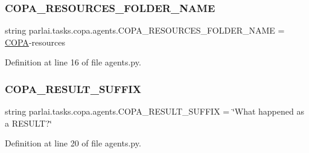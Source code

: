 \subsubsection{\texorpdfstring{C\+O\+P\+A\+\_\+\+R\+E\+S\+O\+U\+R\+C\+E\+S\+\_\+\+F\+O\+L\+D\+E\+R\+\_\+\+N\+A\+ME}{COPA\_RESOURCES\_FOLDER\_NAME}}
{\footnotesize\ttfamily string parlai.\+tasks.\+copa.\+agents.\+C\+O\+P\+A\+\_\+\+R\+E\+S\+O\+U\+R\+C\+E\+S\+\_\+\+F\+O\+L\+D\+E\+R\+\_\+\+N\+A\+ME = \textquotesingle{}\hyperlink{namespaceparlai_1_1tasks_1_1copa_1_1agents_a829704a18561f4fc006f3ef716f90242}{C\+O\+PA}-\/resources\textquotesingle{}}



Definition at line 16 of file agents.\+py.

\mbox{\label{namespaceparlai_1_1tasks_1_1copa_1_1agents_a89226c185edfd8a6ae2186a4b1593857}} 
\subsubsection{\texorpdfstring{C\+O\+P\+A\+\_\+\+R\+E\+S\+U\+L\+T\+\_\+\+S\+U\+F\+F\+IX}{COPA\_RESULT\_SUFFIX}}
{\footnotesize\ttfamily string parlai.\+tasks.\+copa.\+agents.\+C\+O\+P\+A\+\_\+\+R\+E\+S\+U\+L\+T\+\_\+\+S\+U\+F\+F\+IX = \char`\"{}What happened as a R\+E\+S\+U\+LT?\char`\"{}}



Definition at line 20 of file agents.\+py.


